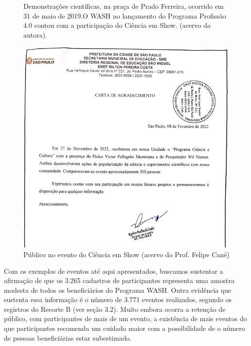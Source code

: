 \begin{figure}[htb]
\begin{minipage}[b]{0.4\linewidth}
                \caption{Demonstrações científicas, na praça de Prado Ferreira, ocorrido em 31 de maio de 2019.O WASH no lançamento do Programa Profissão 4.0 contou com a participação do Ciência em Show. (acervo da autora).}
                \label{7b56c85cc265fcbf261a3bc788ae1e4619b70725}
\end{minipage}
\hspace{0.5cm}
\end{figure}







\captionsetup{format=plain}
\begin{figure}[htb]

\centering


\begin{minipage}[b]{0.4\linewidth}
        \centering
                \includegraphics[width=1.0\linewidth]{../../../imagens/evento-sao-miguel.png}
                \caption{Público no evento do Ciência em Show (acervo do Prof. Felipe Cané)}
                \label{1005d976e3ba4fdcea3be1ed7501eff18485a145}
\end{minipage}%
\hspace{0.5cm}
\end{figure}



Com os exemplos de eventos até aqui apresentados, buscamos sustentar a afirmação de que os 3.265 cadastros de participantes representa uma amostra modesta de todos os beneficiários do Programa WASH. Outra evidência que sustenta essa informação é o número de 3.771 eventos realizados, segundo os registros do Recorte B (ver seção 3.2). Muito embora ocorra a retenção de público, com participantes de mais de um evento, a existência de mais eventos do que participantes recomenda um cuidado maior com a possibilidade de o número de pessoas beneficiárias estar subestimado.

